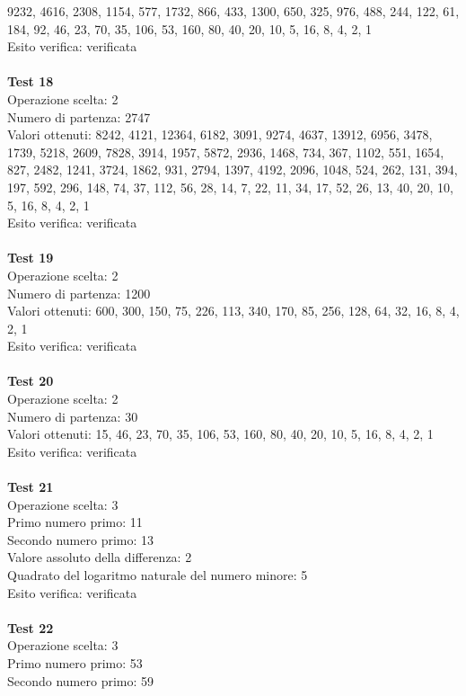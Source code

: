 \documentclass[10pt]{report}
\begin{document}
9232, 4616, 2308, 1154, 577, 1732, 866, 433, 1300, 650, 325, 976, 488, 244, 122, 61, 184, 92, 46, 23, 70, 35, 106, 53, 160, 80, 40, 20, 10, 5, 16, 8, 4, 2, 1
\\Esito verifica: verificata
\\
\\\textbf{Test 18} 
\\Operazione scelta: 2 
\\Numero di partenza: 2747 
\\Valori ottenuti: 8242, 4121, 12364, 6182, 3091, 9274, 4637, 13912, 6956, 3478, 1739, 5218, 2609, 7828, 3914, 1957, 5872, 2936, 1468, 734, 367,
1102, 551, 1654, 827, 2482, 1241, 3724, 1862, 931, 2794, 1397, 4192, 2096, 1048, 524, 262, 131, 394, 197, 592, 296, 148, 74, 37, 112, 56, 28, 14, 7, 22, 11,
34, 17, 52, 26, 13, 40, 20, 10, 5, 16, 8, 4, 2, 1 
\\Esito verifica: verificata
\\
\\
\textbf{Test 19} 
\\Operazione scelta: 2
\\Numero di partenza: 1200
\\Valori ottenuti: 600, 300, 150, 75, 226, 113, 340, 170, 85, 256, 128, 64, 32, 16, 8, 4, 2, 1
\\Esito verifica: verificata
\\
\\\textbf{Test 20} 
\\Operazione scelta: 2
\\Numero di partenza: 30
\\Valori ottenuti: 15, 46, 23, 70, 35, 106, 53, 160, 80, 40, 20, 10, 5, 16, 8, 4, 2, 1
\\Esito verifica: verificata
\\
\\\textbf{Test 21} 
\\Operazione scelta: 3
\\Primo numero primo: 11
\\Secondo numero primo: 13
\\Valore assoluto della differenza: 2
\\Quadrato del logaritmo naturale del numero minore: 5
\\Esito verifica: verificata
\\
\\\textbf{Test 22} 
\\Operazione scelta: 3
\\Primo numero primo: 53
\\Secondo numero primo: 59
\end{document}

